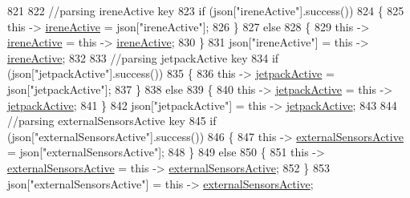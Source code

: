 \begin{DoxyCode}
821             
822             \textcolor{comment}{//parsing ireneActive key           }
823             \textcolor{keywordflow}{if} (json[\textcolor{stringliteral}{"ireneActive"}].success())
824             \{
825                 \textcolor{keyword}{this} -> \hyperlink{class_cool_board_a9c3f7ac625481ee2ae802a25d97a4ae0}{ireneActive} = json[\textcolor{stringliteral}{"ireneActive"}];
826             \}
827             \textcolor{keywordflow}{else}
828             \{
829                 \textcolor{keyword}{this} -> \hyperlink{class_cool_board_a9c3f7ac625481ee2ae802a25d97a4ae0}{ireneActive} = \textcolor{keyword}{this} -> \hyperlink{class_cool_board_a9c3f7ac625481ee2ae802a25d97a4ae0}{ireneActive};
830             \}
831             json[\textcolor{stringliteral}{"ireneActive"}] = \textcolor{keyword}{this} -> \hyperlink{class_cool_board_a9c3f7ac625481ee2ae802a25d97a4ae0}{ireneActive};
832             
833             \textcolor{comment}{//parsing jetpackActive key}
834             \textcolor{keywordflow}{if} (json[\textcolor{stringliteral}{"jetpackActive"}].success())
835             \{
836                 \textcolor{keyword}{this} -> \hyperlink{class_cool_board_a9be03a913d26e558328935ca3b59a75e}{jetpackActive} = json[\textcolor{stringliteral}{"jetpackActive"}];
837             \}
838             \textcolor{keywordflow}{else}
839             \{
840                 \textcolor{keyword}{this} -> \hyperlink{class_cool_board_a9be03a913d26e558328935ca3b59a75e}{jetpackActive} = \textcolor{keyword}{this} -> \hyperlink{class_cool_board_a9be03a913d26e558328935ca3b59a75e}{jetpackActive};
841             \}
842             json[\textcolor{stringliteral}{"jetpackActive"}] = \textcolor{keyword}{this} -> \hyperlink{class_cool_board_a9be03a913d26e558328935ca3b59a75e}{jetpackActive};
843 
844             \textcolor{comment}{//parsing externalSensorsActive key}
845             \textcolor{keywordflow}{if} (json[\textcolor{stringliteral}{"externalSensorsActive"}].success())
846             \{
847                 \textcolor{keyword}{this} -> \hyperlink{class_cool_board_a638b00b76aeb819ecfd4c10b8cdd7bb7}{externalSensorsActive} = json[\textcolor{stringliteral}{"externalSensorsActive"}];
848             \}
849             \textcolor{keywordflow}{else}
850             \{
851                 \textcolor{keyword}{this} -> \hyperlink{class_cool_board_a638b00b76aeb819ecfd4c10b8cdd7bb7}{externalSensorsActive} = \textcolor{keyword}{this} -> 
      \hyperlink{class_cool_board_a638b00b76aeb819ecfd4c10b8cdd7bb7}{externalSensorsActive};
852             \}
853             json[\textcolor{stringliteral}{"externalSensorsActive"}] = \textcolor{keyword}{this} -> \hyperlink{class_cool_board_a638b00b76aeb819ecfd4c10b8cdd7bb7}{externalSensorsActive};

\end{DoxyCode}
